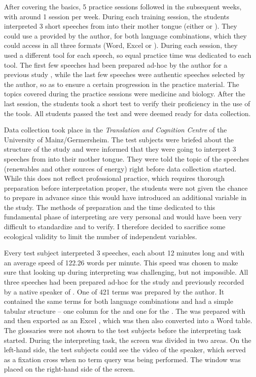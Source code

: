 \documentclass[output=paper]{langsci/langscibook}
\begin{document}
After covering the basics, 5 practice sessions followed in the subsequent weeks, with around 1 session per week. During each training session, the students interpreted 3 short speeches from  into their mother tongue (either  or ). They could use a  provided by the author, for both language combinations, which they could access in all three formats (Word, Excel or ). During each session, they used a different tool for each speech, so equal practice time was dedicated to each tool. The first few speeches had been prepared ad-hoc by the author for a previous study \citep{Prandi2015a, Prandi2015b}, while the last few speeches were authentic speeches selected by the author, so as to ensure a certain progression in the practice material. The topics covered during the practice sessions were medicine and biology. After the last session, the students took a short test to verify their proficiency in the use of the tools. All students passed the test and were deemed ready for data collection.

Data collection took place in the \textit{Translation and Cognition Centre} of the University of Mainz\slash Germersheim. The test subjects were briefed about the structure of the study and were informed that they were going to interpret 3 speeches from  into their mother tongue. They were told the topic of the speeches (renewables and other sources of energy) right before data collection started. While this does not reflect professional practice, which requires thorough preparation before interpretation proper, the students were not given the chance to prepare in advance since this would have introduced an additional variable in the study. The methods of preparation and the time dedicated to this fundamental phase of interpreting are very personal and would have been very difficult to standardize and to verify. I therefore decided to sacrifice some ecological validity to limit the number of independent variables.

Every test subject interpreted 3 speeches, each about 12 minutes long and with an average speed of 122.26 words per minute. This speed was chosen to make sure that looking up  during interpreting was challenging, but not impossible. All three speeches had been prepared ad-hoc for the study and previously recorded by a native speaker of  . One  of 421 terms was prepared by the author. It contained the same terms for both language combinations and had a simple tabular structure – one column for the  and one for the . The  was prepared with  and then exported as an Excel , which was then also converted into a Word table. The glossaries were not shown to the test subjects before the interpreting task started. During the interpreting task, the screen was divided in two areas. On the left-hand side, the test subjects could see the video of the speaker, which served as a fixation cross when no term query was being performed. The  window was placed on the right-hand side of the screen.
\end{document}
